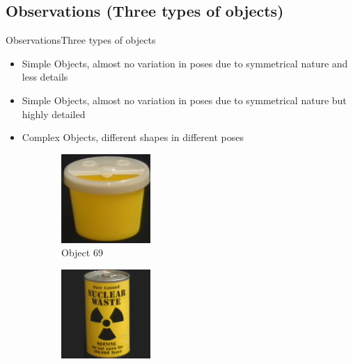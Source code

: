\documentclass[aspectratio=169, handout, 10pt, hyperref=colorlinks]{beamer}
\begin{document}
\subsection{Observations (Three types of objects)}
\begin{frame}{Observations}{Three types of objects}
\begin{itemize}
    \item Simple Objects, almost no variation in poses due to symmetrical nature and less details
    \item Simple Objects, almost no variation in poses due to symmetrical nature but highly detailed
    \item Complex Objects, different shapes in different poses
\end{itemize}
    \begin{figure}
        \centering
        \begin{subfigure}{0.32\linewidth}
            \centering
            \includegraphics[width = 0.6\linewidth]{wireframe/obj70__0.png}
            \vspace{1em}
            \caption{Object 69}
        \end{subfigure}
        \begin{subfigure}{0.32\linewidth}
            \centering
            \includegraphics[width = 0.6\linewidth]{wireframe/obj99__0.png}

\end{subfigure}
\end{figure}
\end{frame}
\end{document}
